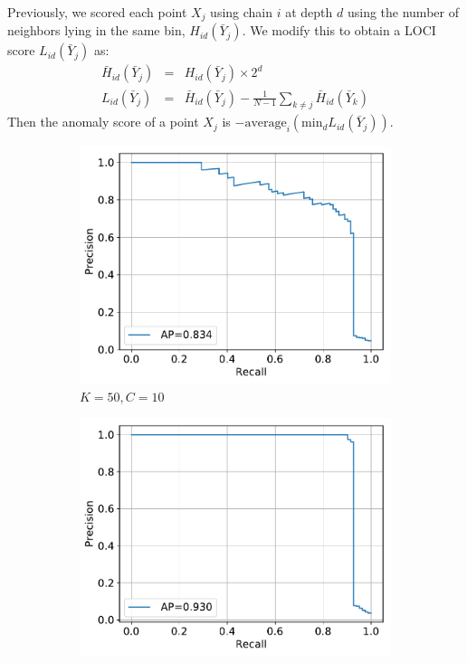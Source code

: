 \documentclass[11pt,onecolumn]{article}
\begin{document}
Previously, we scored each point $X_j$ using chain $i$ at depth $d$ using the number of neighbors lying in the same bin, $H_{id}(\bar{Y}_j)$. We modify this to obtain a LOCI score $L_{id}(\bar{Y}_j)$ as:
\begin{eqnarray}
	\bar{H}_{id}(\bar{Y}_j) &=& H_{id}(\bar{Y}_j) \times 2^d\\
	L_{id}(\bar{Y}_j) &=& \bar{H}_{id}(\bar{Y}_j) - \frac{1}{N-1}\sum_{k \neq j}\bar{H}_{id}(\bar{Y}_k)
\end{eqnarray}
Then the anomaly score of a point $X_j$ is $-\textrm{average}_i\left(\textrm{min}_d L_{id}(\bar{Y}_j)\right)$.

\begin{figure}[ht!]
    \centering
    \begin{subfigure}[t]{0.24\textwidth}
        \centering
        \includegraphics[width=\linewidth]{fig/chains_anomalyscore_pr_k50c10d10.pdf}
        \caption{$K=50, C=10$}
    \end{subfigure}
    \hfill
    \begin{subfigure}[t]{0.24\textwidth}
        \centering
        \includegraphics[width=\linewidth]{fig/chains_anomalyscore_pr_k50c50d10.pdf}

\end{subfigure}
\end{figure}
\end{document}

